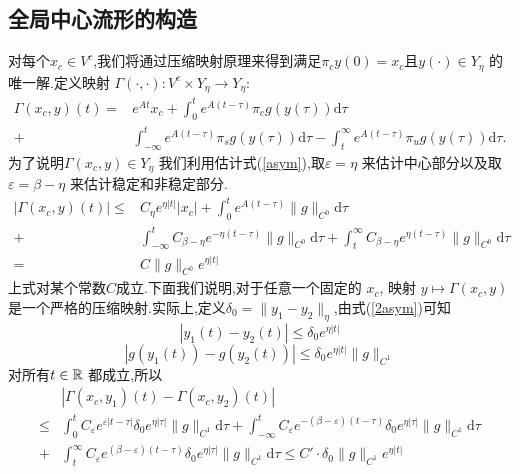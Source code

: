\subsection{全局中心流形的构造}
对每个$x_c\in V^{c}$,我们将通过压缩映射原理来得到满足$\pi_c y(0)=x_c$且$y(\cdot )\in Y_{\eta}$ 的唯一解.定义映射
$\Gamma\left( \cdot ,\cdot  \right) : V^{c}\times Y_\eta\to Y_\eta$:
 \begin{equation}
   \begin{aligned}
     \Gamma(x_c,y)(t)= & e^{At}x_c+\int_0^{t}e^{A(t-\tau)}\pi_cg(y(\tau))\mathrm{d}\tau\\
     +&\int_{-\infty}^{t}e^{A(t-\tau)}\pi_sg(y(\tau))\mathrm{d}\tau-\int_t ^{\infty}e^{A(t-\tau)}\pi_ug(y(\tau))\mathrm{d}\tau.
   \end{aligned}\label{36}
 \end{equation}
 为了说明$\Gamma(x_c,y)\in Y_\eta$ 我们利用估计式(\ref{asym}),取$\varepsilon =\eta$ 来估计中心部分以及取$\varepsilon =\beta-\eta$ 来估计稳定和非稳定部分.
 \begin{equation}
   \begin{aligned}
     \left| \Gamma(x_c,y)(t) \right| \le & C_\eta e^{\eta\left| t \right| }\left| x_c \right| +\int_0^{t}e^{A(t-\tau)}\|g\|_{C^{0}}\mathrm{d}\tau\\
     + & \int_{-\infty}^{t}C_{\beta-\eta}e^{-\eta(t-\tau)}\|g\|_{C^{0}}\mathrm{d}\tau+ \int_t ^{\infty}C_{\beta-\eta}e^{\eta(t-\tau)}\|g\|_{C^{0}}\mathrm{d}\tau\\
     =& C\|g\|_{C^{0}}e^{\eta\left| t \right| }
   \end{aligned}
 \end{equation}
 上式对某个常数$C$成立.下面我们说明,对于任意一个固定的 $x_c$, 映射 $y\mapsto \Gamma(x_c,y)$ 是一个严格的压缩映射.实际上,定义$\delta_0=\|y_1-y_2\|_{\eta}$,由式(\ref{2asym})可知
 \[
   \left| y_1(t)-y_2(t) \right| \le \delta_0e^{\eta\left| t \right| }
 \] 
 \[
   \left| g(y_1(t))-g(y_2(t)) \right| \le \delta_0e^{\eta\left| t \right|}\|g\|_{C^{1}}
 \] 
 对所有$t\in \mathbb{R}$ 都成立,所以
\begin{equation}
  \begin{aligned}
   & \left| \Gamma(x_c,y_1)(t)-\Gamma(x_c,y_2)(t) \right|\\
    \le & \int_0^{t}C_\varepsilon e^{\varepsilon \left| t-\tau \right| }\delta_0e^{\eta\left| \tau \right| }\|g\|_{C^{1}}\mathrm{d}\tau+\int_{-\infty}^{t}C_\varepsilon e^{-(\beta-\varepsilon )(t-\tau)}\delta_{0}e^{\eta\left| \tau \right| }\|g\|_{C^{1}}\mathrm{d}\tau\\
    +& \int_t ^{\infty}C_\varepsilon  e^{(\beta-\varepsilon )(t-\tau)}\delta_0e^{\eta\left| \tau \right| }\|g\|_{C^{1}}\mathrm{d}\tau\le C'\cdot \delta_0 \|g\|_{C^{1}}e^{\eta\left| t \right| }
  \end{aligned}
\end{equation} 
